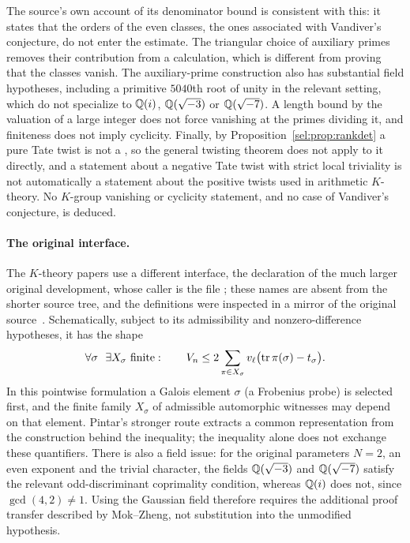 The source's own account of its denominator bound is consistent with this:
it states that the orders of the even classes, the ones associated with
Vandiver's conjecture, do not enter the estimate. The triangular choice of auxiliary primes removes their
contribution from a calculation, which is different from proving that the
classes vanish. The auxiliary-prime construction also has
substantial field hypotheses, including a primitive $5040$th root of unity
in the relevant setting, which do not specialize to $\mathbb{Q}(i)$,
$\mathbb{Q}(\sqrt{-3})$ or $\mathbb{Q}(\sqrt{-7})$. A length bound by the valuation of a
large integer does not force vanishing at the primes dividing it, and
finiteness does not imply cyclicity. Finally, by
Proposition~\ref{sel:prop:rankdet} a pure Tate twist is not a , so
the general twisting theorem does not apply to it directly, and a statement
about a negative Tate twist with strict local triviality is not
automatically a statement about the positive twists used in arithmetic
$K$-theory. No $K$-group vanishing or cyclicity statement, and no case of
Vandiver's conjecture, is deduced.

\paragraph{The original interface.}
The $K$-theory papers use a different interface, the declaration
 of the much larger original
development, whose caller is the file ; these names are
absent from the shorter source tree, and the definitions were inspected
in a mirror of the original source~\cite{Alpoge2026Original}.
Schematically, subject to its admissibility and nonzero-difference
hypotheses, it has the shape
\[
 \forall\sigma\ \ \exists X_\sigma\text{ finite}:\qquad
 V_n\le2\sum_{\pi\in X_\sigma}v_\ell\bigl(\operatorname{tr}\pi(\sigma)-t_\sigma\bigr).
\]
In this pointwise formulation a Galois element $\sigma$ (a Frobenius probe)
is selected first, and the finite family $X_\sigma$ of admissible
automorphic witnesses may depend on that element.
Pintar's stronger route extracts a common representation from the
construction behind the inequality; the inequality alone does not exchange
these quantifiers. There is also a field issue: for the original parameters
$N=2$, an even exponent and the trivial character, the fields
$\mathbb{Q}(\sqrt{-3})$ and $\mathbb{Q}(\sqrt{-7})$ satisfy the relevant odd-discriminant
coprimality condition, whereas $\mathbb{Q}(i)$ does not, since $\gcd(4,2)\ne1$.
Using the Gaussian field therefore requires the additional proof transfer
described by Mok--Zheng, not substitution into the unmodified hypothesis.

